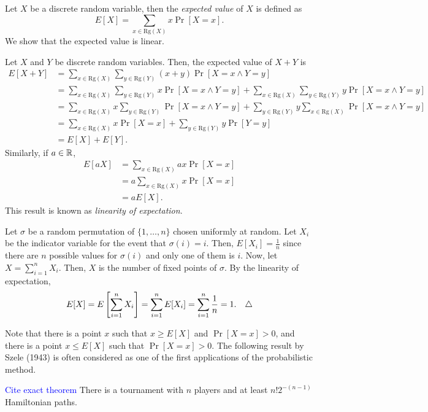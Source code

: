 Let $X$ be a discrete random variable, then the \textit{expected value} of $X$ is defined as 
\[E[X] = \sum_{x \in \text{Rg}(X)} x\Pr[X = x].\]
We show that the expected value is linear. \par
Let $X$ and $Y$ be discrete random variables. Then, the expected value of $X + Y$ is
\begin{align*}
    E[X + Y] &= \sum_{x \in \text{Rg}(X)} \sum_{y \in \text{Rg}(Y)} (x + y)\Pr[X = x \wedge Y = y] \\
    &= \sum_{x \in \text{Rg}(X)} \sum_{y \in \text{Rg}(Y)} x\Pr[X = x \wedge Y = y] + \sum_{x \in \text{Rg}(X)} \sum_{y \in \text{Rg}(Y)} y\Pr[X = x \wedge Y = y] \\
    &= \sum_{x \in \text{Rg}(X)} x\sum_{y \in \text{Rg}(Y)} \Pr[X = x \wedge Y = y] + \sum_{y \in \text{Rg}(Y)} y\sum_{x \in \text{Rg}(X)} \Pr[X = x \wedge Y = y] \\
    &= \sum_{x \in \text{Rg}(X)} x\Pr[X = x] + \sum_{y \in \text{Rg}(Y)} y\Pr[Y = y] \\
    &= E[X] + E[Y].
\end{align*}
Similarly, if $a \in \mathbb{R}$,
\begin{align*}
    E[aX] &= \sum_{x \in \text{Rg}(X)} ax\Pr[X = x] \\
    &= a\sum_{x \in \text{Rg}(X)} x\Pr[X = x] \\
    &= aE[X].
\end{align*}
This result is known as \textit{linearity of expectation}. 
\begin{example}\label{ex:probmet:linearity}\cite{alon2016probabilistic}
    Let $\sigma$ be a random permutation of $\{1, \ldots, n\}$ chosen uniformly at random. Let $X_i$ be the indicator variable for the event that $\sigma(i) = i$. Then, $E[X_i] = \frac{1}{n}$ since there are $n$ possible values for $\sigma(i)$ and only one of them is $i$. Now, let $X = \sum_{i = 1}^n X_i$. Then, $X$ is the number of fixed points of $\sigma$. By the linearity of expectation,
    \[E[X] = E\left[\sum_{i = 1}^n X_i\right] = \sum_{i = 1}^n E[X_i] = \sum_{i = 1}^n \frac{1}{n} = 1.\tqed\]
\end{example}
Note that there is a point $x$ such that $x \geq E[X]$ and $\Pr[X = x] > 0$, and there is a point $x \leq E[X]$ such that $\Pr[X = x] > 0$. The following result by Szele (1943) is often considered as one of the first applications of the probabilistic method. \par
\begin{theorem} \textcolor{blue}{Cite exact theorem}
    There is a tournament with $n$ players and at least $n!2^{-(n - 1)}$ Hamiltonian paths. 
\end{theorem}
